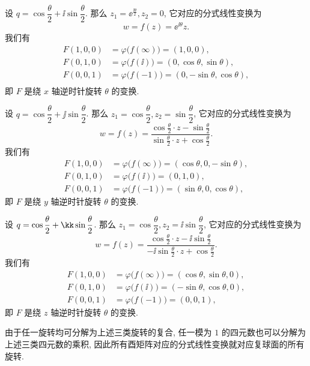 \begin{example}\delspace
  \begin{enumnopar}[(i)]
    \item 设 $q=\cos\dfrac\theta2+\ii\sin\dfrac\theta 2$.
    那么 $z_1=\ee^{\frac{\ii\theta}2}, z_2=0$, 它对应的分式线性变换为
    \[
      w=f(z)=\ee^{\ii\theta}z.
    \]
    我们有
    \begin{align*}
        F(1,0,0)&
      =\varphi\bigl(f(\infty)\bigr)
      =(1,0,0),\\
        F(0,1,0)&
      =\varphi\bigl(f(\ii)\bigr)
      =(0,\cos\theta,\sin\theta),\\
       F(0,0,1)&
      =\varphi\bigl(f(-1)\bigr)
      =(0,-\sin\theta,\cos\theta),\\
    \end{align*}
    即 $F$ 是绕 $x$ 轴逆时针旋转 $\theta$ 的变换.
    \item 设 $q=\cos\dfrac\theta2+\jj\sin\dfrac\theta 2$.
    那么 $z_1=\cos\dfrac\theta2, z_2=\sin\dfrac\theta2$, 它对应的分式线性变换为
    \[
      w=f(z)=\frac{\cos \frac\theta2 \cdot z-\sin\frac\theta2}{\sin\frac\theta2 \cdot z+\cos\frac\theta2}.
    \]
    我们有
    \begin{align*}
        F(1,0,0)&
      =\varphi\bigl(f(\infty)\bigr)
      =(\cos\theta,0,-\sin\theta),\\
        F(0,1,0)&
      =\varphi\bigl(f(\ii)\bigr)
      =(0,1,0),\\
        F(0,0,1)&
      =\varphi\bigl(f(-1)\bigr)
      =(\sin\theta,0,\cos\theta),
    \end{align*}
    即 $F$ 是绕 $y$ 轴逆时针旋转 $\theta$ 的变换.
    \item 设 $q=\cos\dfrac\theta2+\kk\sin\dfrac\theta 2$.
    那么 $z_1=\cos\dfrac\theta2, z_2=\ii\sin\dfrac\theta2$, 它对应的分式线性变换为
    \[
      w=f(z)=\frac{\cos \frac\theta2 \cdot z-\ii \sin\frac\theta2}{-\ii\sin\frac\theta2 \cdot z+\cos\frac\theta2}.
    \]
    我们有
    \begin{align*}
        F(1,0,0)&
      =\varphi\bigl(f(\infty)\bigr)
      =(\cos\theta,\sin\theta,0),\\
        F(0,1,0)&
      =\varphi\bigl(f(\ii)\bigr)
      =(-\sin\theta,\cos\theta,0),\\
        F(0,0,1)&
      =\varphi\bigl(f(-1)\bigr)
      =(0,0,1),
    \end{align*}
    即 $F$ 是绕 $z$ 轴逆时针旋转 $\theta$ 的变换.
  \end{enumnopar}

  由于任一旋转均可分解为上述三类旋转的复合, 任一模为 $1$ 的四元数也可以分解为上述三类四元数的乘积, 因此所有酉矩阵对应的分式线性变换就对应复球面的所有旋转.
\end{example}


